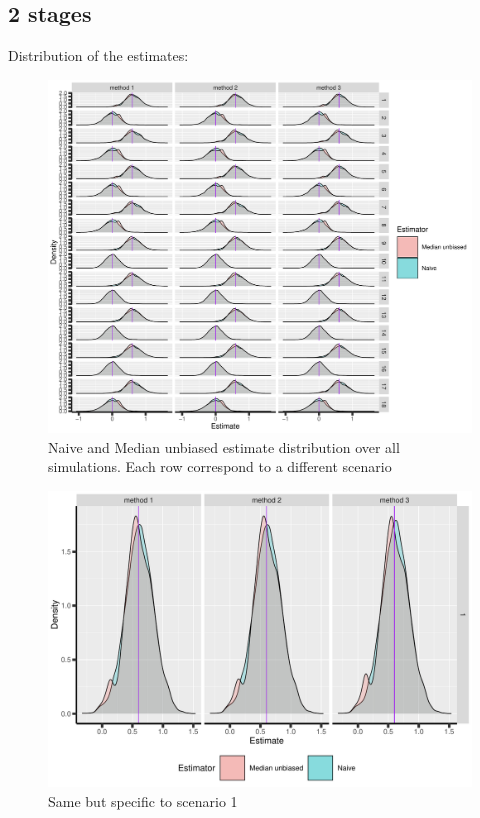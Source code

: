 \documentclass[12pt]{article}
\begin{document}
\subsection{2 stages}
\label{sec:org554815b}
Distribution of the estimates:
\begin{figure}[!h]
\centering
\includegraphics[trim={0 0 0 0},width=1\textwidth]{./figures/gg2stage-estimate-density.pdf}
\caption{Naive and Median unbiased estimate distribution over all simulations. Each row correspond to a different scenario}
\end{figure}

\begin{figure}[!h]
\centering
\includegraphics[trim={0 0 0 0},width=\textwidth]{./figures/gg2stage-estimate-density-scenario1.pdf}
\caption{Same but specific to scenario 1}
\end{figure}
\end{document}
